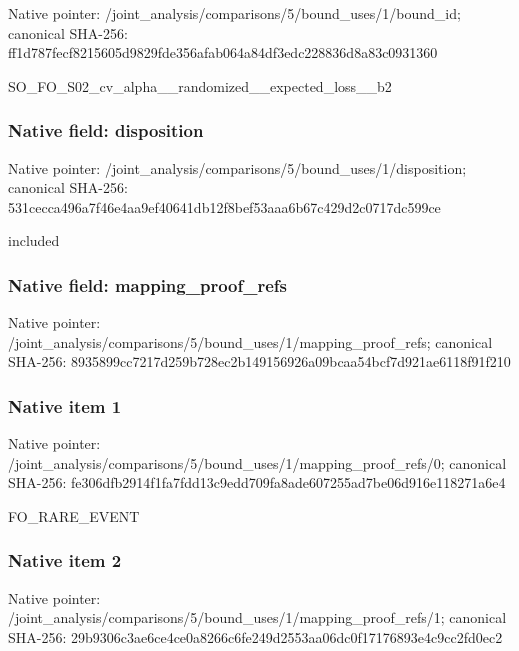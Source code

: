 \documentclass[10pt,a4paper]{article}
\begin{document}
Native pointer: /joint\_analysis/comparis\allowbreak{}ons/5/bound\_uses/1/bound\allowbreak{}\_id; canonical SHA-256: ff1d787fecf8215605d9829f\allowbreak{}de356afab064a84df3edc228\allowbreak{}836d8a83c0931360


SO\_FO\_S02\_cv\_alpha\_\_rand\allowbreak{}omized\_\_expected\_loss\_\_b\allowbreak{}2


\subsubsection{Native field: disposition}


Native pointer: /joint\_analysis/comparis\allowbreak{}ons/5/bound\_uses/1/dispo\allowbreak{}sition; canonical SHA-256: 531cecca496a7f46e4aa9ef4\allowbreak{}0641db12f8bef53aaa6b67c4\allowbreak{}29d2c0717dc599ce


included


\subsubsection{Native field: mapping\_proof\_refs}


Native pointer: /joint\_analysis/comparis\allowbreak{}ons/5/bound\_uses/1/mappi\allowbreak{}ng\_proof\_refs; canonical SHA-256: 8935899cc7217d259b728ec2\allowbreak{}b149156926a09bcaa54bcf7d\allowbreak{}921ae6118f91f210



\subsubsection{Native item 1}


Native pointer: /joint\_analysis/comparis\allowbreak{}ons/5/bound\_uses/1/mappi\allowbreak{}ng\_proof\_refs/0; canonical SHA-256: fe306dfb2914f1fa7fdd13c9\allowbreak{}edd709fa8ade607255ad7be0\allowbreak{}6d916e118271a6e4


FO\_RARE\_EVENT


\subsubsection{Native item 2}


Native pointer: /joint\_analysis/comparis\allowbreak{}ons/5/bound\_uses/1/mappi\allowbreak{}ng\_proof\_refs/1; canonical SHA-256: 29b9306c3ae6ce4ce0a8266c\allowbreak{}6fe249d2553aa06dc0f17176\allowbreak{}893e4c9cc2fd0ec2
\end{document}
